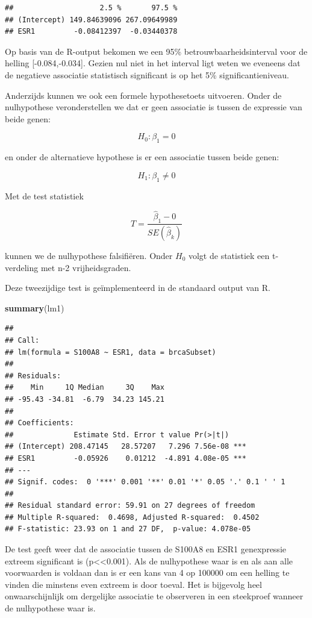 \documentclass[
  12pt,dutch]{book}
\newenvironment{Shaded}{\begin{snugshade}}{\end{snugshade}}
\newcommand{\FunctionTok}[1]{\textcolor[rgb]{0.13,0.29,0.53}{\textbf{#1}}}
\newcommand{\NormalTok}[1]{#1}
\theoremstyle{definition}
\theoremstyle{definition}
\theoremstyle{definition}
\theoremstyle{definition}
\theoremstyle{remark}
\begin{document}
\begin{verbatim}
##                    2.5 %       97.5 %
## (Intercept) 149.84639096 267.09649989
## ESR1         -0.08412397  -0.03440378
\end{verbatim}

Op basis van de R-output bekomen we een 95\% betrouwbaarheidsinterval voor de helling {[}-0.084,-0.034{]}.
Gezien nul niet in het interval ligt weten we eveneens dat de negatieve associatie statistisch significant is op het 5\% significantieniveau.

Anderzijds kunnen we ook een formele hypothesetoets uitvoeren. Onder de nulhypothese veronderstellen we dat er geen associatie is tussen de expressie van beide genen:

\[H_0: \beta_1=0\]

en onder de alternatieve hypothese is er een associatie tussen beide genen:

\[H_1: \beta_1\neq0\]

Met de test statistiek

\[T=\frac{\hat{\beta}_1-0}{SE(\hat{\beta}_k)}\]

kunnen we de nulhypothese falsifiëren. Onder \(H_0\) volgt de statistiek een t-verdeling met n-2 vrijheidsgraden.

Deze tweezijdige test is geïmplementeerd in de standaard output van R.

\begin{Shaded}
\begin{Highlighting}[]
\FunctionTok{summary}\NormalTok{(lm1)}
\end{Highlighting}
\end{Shaded}

\begin{verbatim}
## 
## Call:
## lm(formula = S100A8 ~ ESR1, data = brcaSubset)
## 
## Residuals:
##    Min     1Q Median     3Q    Max 
## -95.43 -34.81  -6.79  34.23 145.21 
## 
## Coefficients:
##              Estimate Std. Error t value Pr(>|t|)    
## (Intercept) 208.47145   28.57207   7.296 7.56e-08 ***
## ESR1         -0.05926    0.01212  -4.891 4.08e-05 ***
## ---
## Signif. codes:  0 '***' 0.001 '**' 0.01 '*' 0.05 '.' 0.1 ' ' 1
## 
## Residual standard error: 59.91 on 27 degrees of freedom
## Multiple R-squared:  0.4698, Adjusted R-squared:  0.4502 
## F-statistic: 23.93 on 1 and 27 DF,  p-value: 4.078e-05
\end{verbatim}

De test geeft weer dat de associatie tussen de S100A8 en ESR1 genexpressie extreem significant is (p\textless\textless0.001). Als de nulhypothese waar is en als aan alle voorwaarden is voldaan dan is er een kans van 4 op 100000 om een helling te vinden die minstens even extreem is door toeval. Het is bijgevolg heel onwaarschijnlijk om dergelijke associatie te observeren in een steekproef wanneer de nulhypothese waar is.
\end{document}
